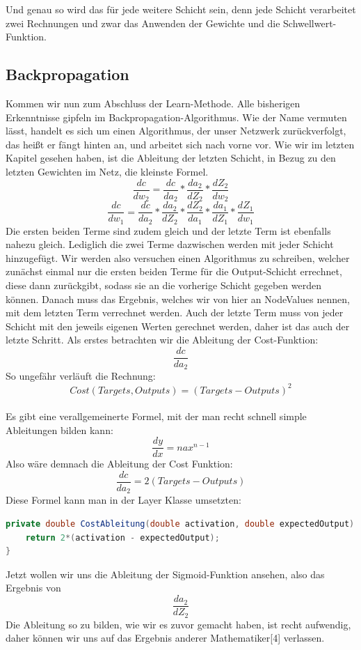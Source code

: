 \documentclass[12pt]{article}
\begin{document}
Und genau so wird das für jede weitere Schicht sein, denn jede Schicht verarbeitet zwei Rechnungen und zwar das Anwenden der Gewichte und die Schwellwert-Funktion.\subsection{Backpropagation}Kommen wir nun zum Abschluss der Learn-Methode. Alle bisherigen Erkenntnisse gipfeln im Backpropagation-Algorithmus. Wie der Name vermuten lässt, handelt es sich um einen Algorithmus, der unser Netzwerk zurückverfolgt, das heißt er fängt hinten an, und arbeitet sich nach vorne vor. 
Wie wir im letzten Kapitel gesehen haben, ist die Ableitung der letzten Schicht, in Bezug zu den letzten Gewichten im Netz, die kleinste Formel. 
$$\frac{ dc }{ dw_{ 2 } }=
\frac{ dc }{ da_{ 2 } }*
\frac{ da_{ 2 } }{ dZ_{ 2 } }*
\frac{ dZ_{ 2 } }{ dw_{ 2 } }$$
$$\frac{ dc }{ dw_{ 1 } }=
\frac{ dc }{ da_{ 2 } }*
\frac{ da_{ 2 } }{ dZ_{ 2 } }*
\frac{ dZ_{ 2 } }{ da_{ 1 } }*
\frac{ da_{ 1 } }{ dZ_{ 1 } }*
\frac{ dZ_{ 1 } }{ dw_{ 1 } }$$
Die ersten beiden Terme sind zudem gleich und der letzte Term ist ebenfalls nahezu gleich. Lediglich die zwei Terme dazwischen werden mit jeder Schicht hinzugefügt. Wir werden also versuchen einen Algorithmus zu schreiben, welcher zunächst einmal nur die ersten beiden Terme für die Output-Schicht errechnet, diese dann zurückgibt, sodass sie an die vorherige Schicht gegeben werden können. Danach muss das Ergebnis, welches wir von hier an NodeValues nennen, mit dem letzten Term verrechnet werden. Auch der letzte Term muss von jeder Schicht mit den jeweils eigenen Werten gerechnet werden, daher ist das auch der letzte Schritt. Als erstes betrachten wir die Ableitung der Cost-Funktion:
$$\frac{ dc }{ da_{ 2 } }$$
So ungefähr verläuft die Rechnung:\\
$$Cost(Targets, Outputs) = (Targets - Outputs)^2$$\\
Es gibt eine verallgemeinerte Formel, mit der man recht schnell simple Ableitungen bilden kann:
$$\frac{dy}{dx}=nax^{n-1}$$
Also wäre demnach die Ableitung der Cost Funktion:
$$\frac{dc}{da_2}=2(Targets-Outputs)$$
Diese Formel kann man in der Layer Klasse umsetzten:\begin{lstlisting}[language=Java]
private double CostAbleitung(double activation, double expectedOutput) {
    return 2*(activation - expectedOutput);
}
\end{lstlisting}
Jetzt wollen wir uns die Ableitung der Sigmoid-Funktion ansehen, also das Ergebnis von
$$\frac{da_2}{dZ_2}$$
Die Ableitung so zu bilden, wie wir es zuvor gemacht haben, ist recht aufwendig, daher können wir uns auf das Ergebnis anderer Mathematiker[4] verlassen.
\end{document}
